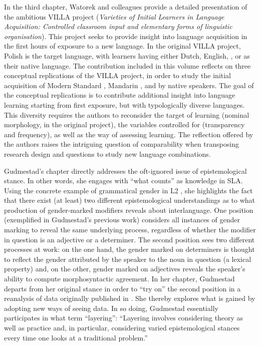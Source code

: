 \documentclass[output=paper]{../langscibook}
\begin{document}
{{In the third chapter, Watorek and colleagues provide a detailed presentation of the ambitious VILLA project (}}\textit{Varieties of Initial Learners in Language Acquisition: Controlled classroom input and elementary forms of linguistic organisation}{{). This project seeks to provide insight into language acquisition in the first hours of exposure to a new language. In the original VILLA project, Polish is the target language, with learners having either Dutch, English, ,  or  as their native language. The contribution included in this volume reflects on three conceptual replications of the VILLA project, in order to study the initial acquisition of Modern Standard , Mandarin , and  by native  speakers. The goal of the conceptual replications is to contribute additional insight into language learning starting from first exposure, but with typologically diverse languages. This diversity requires the authors to reconsider the target of learning (nominal morphology, in the original project), the variables controlled for (transparency and frequency), as well as the way of assessing learning. The reflection offered by the authors raises the intriguing question of comparability when transposing research design and questions to study new language combinations.}}

{Gudmestad’s chapter directly addresses the oft-ignored issue of epistemological stance. In other words, she engages with ``what counts'' as knowledge in SLA. Using the concrete example of grammatical gender in L2 , she highlights the fact that there exist (at least) two different epistemological understandings as to what production of gender-marked modifiers reveals about interlanguage. One position (exemplified in Gudmestad’s previous work) considers all instances of gender marking to reveal the same underlying process, regardless of whether the modifier in question is an adjective or a determiner. The second position sees two different processes at work: on the one hand, the gender marked on determiners is thought to reflect the gender attributed by the speaker to the noun in question (a lexical property) and, on the other, gender marked on adjectives reveals the speaker’s ability to compute morphosyntactic agreement. In her chapter, Gudmestad departs from her original stance in order to ``try on'' the second position in a reanalysis of data originally published in \citet{GudmestadEtAl2019}. She thereby explores what is gained by adopting new ways of seeing data. In so doing, Gudmestad essentially participates in what \citet[214]{KingMackey2016} term “layering”:} “Layering involves considering theory as well as practice and, in particular, considering varied epistemological stances every time one looks at a traditional problem.”
\end{document}
